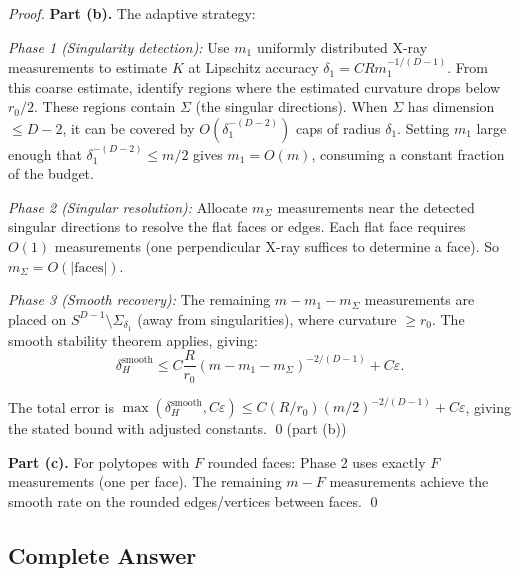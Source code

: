 \begin{proof}
\textbf{Part (b).} The adaptive strategy:

\emph{Phase 1 (Singularity detection):} Use $m_1$ uniformly distributed X-ray measurements to estimate $K$ at Lipschitz accuracy $\delta_1 = C R m_1^{-1/(D-1)}$. From this coarse estimate, identify regions where the estimated curvature drops below $r_0/2$. These regions contain $\Sigma$ (the singular directions). When $\Sigma$ has dimension $\leq D-2$, it can be covered by $O(\delta_1^{-(D-2)})$ caps of radius $\delta_1$. Setting $m_1$ large enough that $\delta_1^{-(D-2)} \leq m/2$ gives $m_1 = O(m)$, consuming a constant fraction of the budget.

\emph{Phase 2 (Singular resolution):} Allocate $m_\Sigma$ measurements near the detected singular directions to resolve the flat faces or edges. Each flat face requires $O(1)$ measurements (one perpendicular X-ray suffices to determine a face). So $m_\Sigma = O(|\text{faces}|)$.

\emph{Phase 3 (Smooth recovery):} The remaining $m - m_1 - m_\Sigma$ measurements are placed on $S^{D-1} \setminus \Sigma_{\delta_1}$ (away from singularities), where curvature $\geq r_0$. The smooth stability theorem applies, giving:
\[
  \delta_H^{\mathrm{smooth}} \leq C \frac{R}{r_0} (m - m_1 - m_\Sigma)^{-2/(D-1)} + C\varepsilon.
\]

The total error is $\max(\delta_H^{\mathrm{smooth}}, C\varepsilon) \leq C(R/r_0)(m/2)^{-2/(D-1)} + C\varepsilon$, giving the stated bound with adjusted constants. \qed (part (b))

\textbf{Part (c).} For polytopes with $F$ rounded faces: Phase 2 uses exactly $F$ measurements (one per face). The remaining $m - F$ measurements achieve the smooth rate on the rounded edges/vertices between faces. \qed
\end{proof}


\subsection{Complete Answer}

